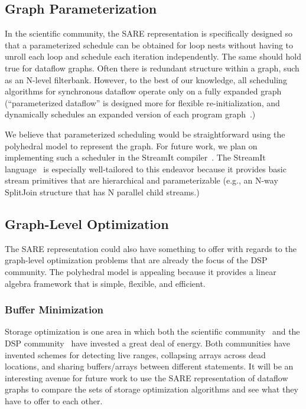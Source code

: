 \subsection{Graph Parameterization}

In the scientific community, the SARE representation is specifically
designed so that a parameterized schedule can be obtained for loop
nests without having to unroll each loop and schedule each iteration
independently.  The same should hold true for dataflow graphs.  Often
there is redundant structure within a graph, such as an N-level
filterbank.  However, to the best of our knowledge, all scheduling
algorithms for synchronous dataflow operate only on a fully expanded
graph (``parameterized dataflow'' is designed more for flexible
re-initialization, and dynamically schedules an expanded version of
each program graph~\cite{Bhatt00}.)

We believe that parameterized scheduling would be straightforward
using the polyhedral model to represent the graph.  For future work,
we plan on implementing such a scheduler in the StreamIt
compiler~\cite{Gordo02}.  The StreamIt language~\cite{streamitcc} is
especially well-tailored to this endeavor because it provides basic
stream primitives that are hierarchical and parameterizable (e.g., an
N-way SplitJoin structure that has N parallel child streams.)

\subsection{Graph-Level Optimization}

The SARE representation could also have something to offer with
regards to the graph-level optimization problems that are already the
focus of the DSP community.  The polyhedral model is appealing because
it provides a linear algebra framework that is simple, flexible, and
efficient.

\subsubsection{Buffer Minimization}

Storage optimization is one area in which both the scientific
community~\cite{Lim01,Quillere,Thies01,Lefebvre98} and the DSP
community~\cite{murt1997x1,GGD94,murt2001x1} have invested a great
deal of energy.  Both communities have invented schemes for detecting
live ranges, collapsing arrays across dead locations, and sharing
buffers/arrays between different statements.  It will be an
interesting avenue for future work to use the SARE representation of
dataflow graphs to compare the sets of storage optimization algorithms
and see what they have to offer to each other.

